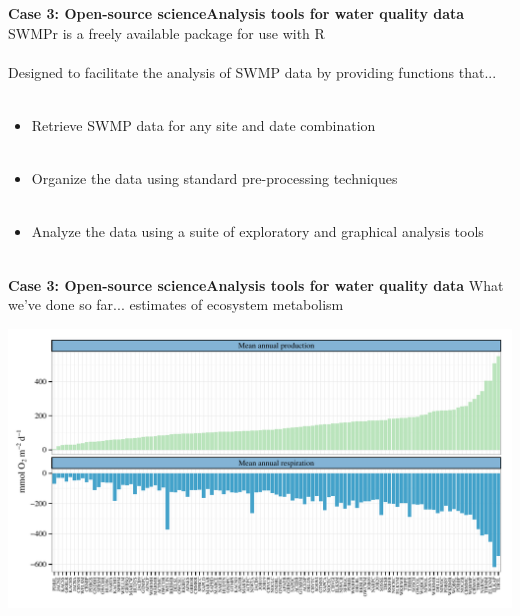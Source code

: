 \documentclass[serif]{beamer}\usepackage[]{graphicx}\usepackage[]{color}
\makeatletter
\def\maxwidth{ %
  \ifdim\Gin@nat@width>\linewidth
    \linewidth
  \else
    \Gin@nat@width
  \fi
}
\makeatother
\begin{document}
\begin{frame}{\textbf{Case 3: Open-source science}}{\textbf{Analysis tools for water quality data}}
\alert{SWMPr} is a freely available package for use with R \\~\\
Designed to facilitate the analysis of SWMP data by providing functions that...\\~\\
\begin{itemize}
\item \alert{Retrieve} SWMP data for any site and date combination \\~\\ 
\item \alert{Organize} the data using standard pre-processing techniques \\~\\
\item \alert{Analyze} the data using a suite of exploratory and graphical analysis tools \\~\\
\end{itemize}
\end{frame}

\begin{frame}{\textbf{Case 3: Open-source science}}{\textbf{Analysis tools for water quality data}}
What we've done so far... estimates of ecosystem metabolism 


{\centering \includegraphics[width=\maxwidth]{fig//metab-1} 

}



\end{frame}
\end{document}
